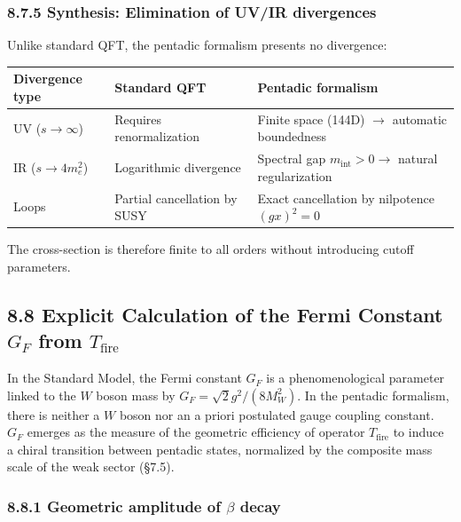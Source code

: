 \documentclass[11pt]{article}
\begin{document}
\hypertarget{synthesis-elimination-of-uvir-divergences}{%
\subsubsection{8.7.5 Synthesis: Elimination of UV/IR
divergences}\label{synthesis-elimination-of-uvir-divergences}}

Unlike standard QFT, the pentadic formalism presents no divergence:

\begin{table}[H]
\centering
\begin{tabular}{@{}lll@{}}
\toprule
Divergence type & Standard QFT & Pentadic formalism \\
\midrule
UV ($s \to \infty$) & Requires renormalization & Finite space (144D) $\to$ automatic boundedness \\
IR ($s \to 4m_e^2$) & Logarithmic divergence & Spectral gap $m_{\text{int}} > 0 \to$ natural regularization \\
Loops & Partial cancellation by SUSY & Exact cancellation by nilpotence $(gx)^2=0$ \\
\bottomrule
\end{tabular}
\end{table}

The cross-section is therefore finite to all orders without introducing
cutoff parameters.

\hypertarget{explicit-calculation-of-the-fermi-constant-g_f-from-t_textfire}{%
\subsection{\texorpdfstring{8.8 Explicit Calculation of the Fermi
Constant \(G_F\) from
\(T_{\text{fire}}\)}{8.8 Explicit Calculation of the Fermi Constant G\_F from T\_\{\textbackslash text\{fire\}\}}}\label{explicit-calculation-of-the-fermi-constant-g_f-from-t_textfire}}

In the Standard Model, the Fermi constant \(G_F\) is a phenomenological
parameter linked to the \(W\) boson mass by
\(G_F = \sqrt{2}g^2/(8M_W^2)\). In the pentadic formalism, there is
neither a \(W\) boson nor an a priori postulated gauge coupling
constant. \(G_F\) emerges as the measure of the geometric efficiency of
operator \(T_{\text{fire}}\) to induce a chiral transition between
pentadic states, normalized by the composite mass scale of the weak
sector (§7.5).

\hypertarget{geometric-amplitude-of-beta-decay}{%
\subsubsection{\texorpdfstring{8.8.1 Geometric amplitude of \(\beta\)
decay}{8.8.1 Geometric amplitude of \textbackslash beta decay}}\label{geometric-amplitude-of-beta-decay}}
\end{document}
